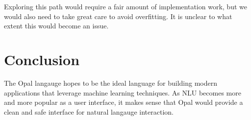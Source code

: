 \documentclass[twocolumn]{article}
\begin{document}
Exploring this path would require a fair amount of implementation work, but we
would also need to take great care to avoid overfitting. It is unclear to what
extent this would become an issue.

\section{Conclusion} \label{conclusion}
The Opal langauge hopes to be the ideal language for building modern
applications that leverage machine learning techniques. As NLU becomes more and
more popular as a user interface, it makes sense that Opal would provide a clean
and safe interface for natural langauge interaction.
\end{document}

